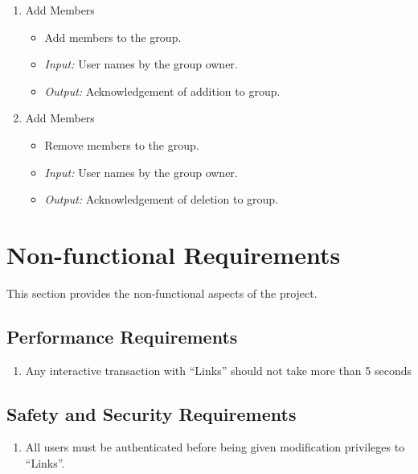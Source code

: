 \documentclass[11pt]{report} %
\begin{document}
\begin{enumerate}
	\item
		Add Members
		\begin{itemize}
			\item
				Add members to the group.
			\item
				\emph{Input:} User names by the group owner.
			\item
				\emph{Output:} Acknowledgement of addition to group.
		\end{itemize}


	\item
		Add Members
		\begin{itemize}
			\item
				Remove members to the group.
			\item
				\emph{Input:} User names by the group owner.
			\item
				\emph{Output:} Acknowledgement of deletion to group.
		\end{itemize}
\end{enumerate}
\maketitle
\chapter{Non-functional Requirements}
This section provides the non-functional aspects of the project.
\section{Performance Requirements}
\begin{enumerate}
\item
Any interactive transaction with “Links” should not take more than 5 seconds
\end{enumerate}
\section{Safety and Security Requirements}
\begin{enumerate}
\item
All users must be authenticated before being given modification privileges to “Links”.
\end{enumerate}
\end{document}
